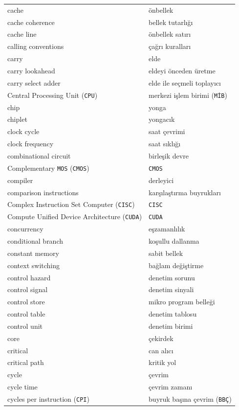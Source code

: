 {\begin{longtable}{@{}p{7.6cm}p{7.6cm}@{}}
cache & önbellek \\
cache coherence & bellek tutarlığı \\
cache line & önbellek satırı \\
calling conventions & çağrı kuralları \\
carry & elde \\
carry lookahead & eldeyi önceden üretme \\
carry select adder & elde ile seçmeli toplayıcı \\
Central Processing Unit (\texttt{CPU}) & merkezi işlem birimi (\texttt{MİB}) \\
chip & yonga \\
chiplet & yongacık \\
clock cycle & saat çevrimi \\
clock frequency & saat sıklığı \\
combinational circuit & birleşik devre \\
Complementary \texttt{MOS} (\texttt{CMOS}) & \texttt{CMOS} \\
compiler & derleyici \\
comparison instructions & karşılaştırma buyrukları \\
Complex Instruction Set Computer (\texttt{CISC}) & \texttt{CISC} \\
Compute Unified Device Architecture (\texttt{CUDA}) & \texttt{CUDA} \\
concurrency & eşzamanlılık \\
conditional branch & koşullu dallanma \\
constant memory & sabit bellek \\
context switching & bağlam değiştirme \\
control hazard & denetim sorunu \\
control signal & denetim sinyali \\
control store & mikro program belleği \\
control table & denetim tablosu \\
control unit & denetim birimi \\
core & çekirdek \\
critical & can alıcı \\
critical path & kritik yol \\
cycle & çevrim \\
cycle time & çevrim zamanı \\
cycles per instruction (\texttt{CPI}) & buyruk başına çevrim (\texttt{BBÇ}) \\


\end{longtable}}
